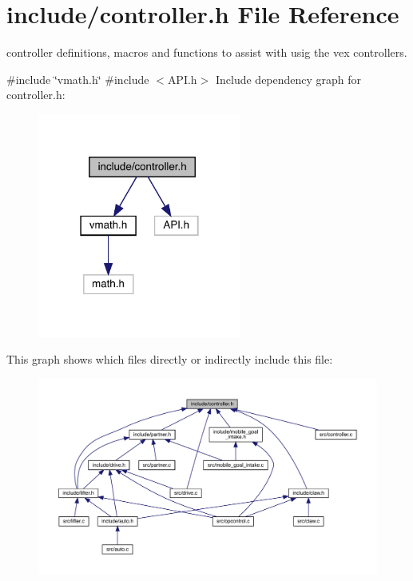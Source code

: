 \section{include/controller.h File Reference}
\label{controller_8h}


controller definitions, macros and functions to assist with usig the vex controllers.  


{\ttfamily \#include \char`\"{}vmath.\+h\char`\"{}}\newline
{\ttfamily \#include $<$A\+P\+I.\+h$>$}\newline
Include dependency graph for controller.\+h\+:\nopagebreak
\begin{figure}[H]
\begin{center}
\leavevmode
\includegraphics[width=190pt]{controller_8h__incl}
\end{center}
\end{figure}
This graph shows which files directly or indirectly include this file\+:\nopagebreak
\begin{figure}[H]
\begin{center}
\leavevmode
\includegraphics[width=350pt]{controller_8h__dep__incl}
\end{center}
\end{figure}
